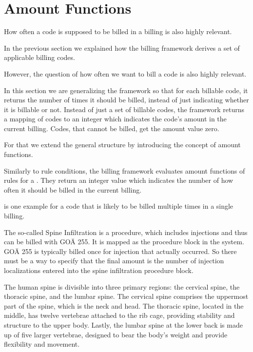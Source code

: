 \section{Amount Functions}\label{sec:amount-functions}


How often a code is supposed to be billed in a billing is also highly relevant.

In the previous section we explained how the billing framework derives a set of applicable billing codes.

However, the question of how often we want to bill a code is also highly relevant.

In this section we are generalizing the framework so that for each billable code, it returns the number of times it should be billed, instead of just indicating whether it is billable or not.
Instead of just a set of billable codes, the framework returns a mapping of codes to an integer which indicates the code's amount in the current billing.
Codes, that cannot be billed, get the amount value zero.

For that we extend the general structure by introducing the concept of amount functions.

Similarly to rule conditions, the billing framework evaluates amount functions of rules for a .
They return an integer value which indicates the number of how often it should be billed in the current billing.

\cite{hermanns2013bemessung} is one example for a code that is likely to be billed multiple times in a single billing.

The so-called Spine Infiltration is a procedure, which includes injections and thus can be billed with GOÄ 255.
It is mapped as the procedure block  in the system.
GOÄ 255 is typically billed once for injection that actually occurred.
So there must be a way to specify that the final amount is the number of injection localizations entered into the spine infiltration procedure block.

The human spine is divisible into three primary regions:
the cervical spine, the thoracic spine, and the lumbar spine.
The cervical spine comprises the uppermost part of the spine, which is the neck and head.
The thoracic spine, located in the middle, has twelve vertebrae attached to the rib cage, providing stability and structure to the upper body. Lastly, the lumbar spine at the lower back is made up of five larger vertebrae, designed to bear the body's weight and provide flexibility and movement.


